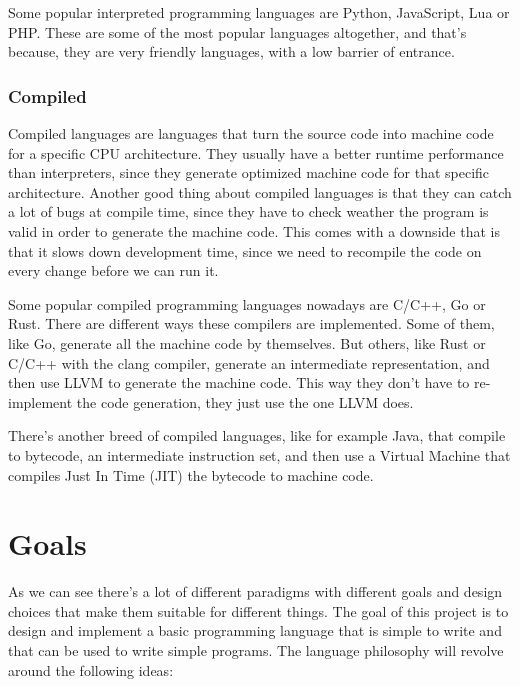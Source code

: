 ﻿\documentclass[10pt,a4paper,twocolumn,twoside]{article}
\begin{document}
Some popular interpreted programming languages are Python, JavaScript, Lua or
PHP. These are some of the most popular languages altogether, and that's
because, they are very friendly languages, with a low barrier of entrance.

\subsubsection{Compiled}
Compiled languages are languages that turn the source code into machine code for
a specific CPU architecture. They usually have a better runtime performance than
interpreters, since they generate optimized machine code for that specific
architecture. Another good thing about compiled languages is that they can catch
a lot of bugs at compile time, since they have to check weather the program is
valid in order to generate the machine code. This comes with a downside that is
that it slows down development time, since we need to recompile the code on
every change before we can run it.

Some popular compiled programming languages nowadays are C/C++, Go or Rust.
There are different ways these compilers are implemented. Some of them, like Go,
generate all the machine code by themselves. But others, like Rust or C/C++ with
the clang compiler, generate an intermediate representation, and then use LLVM
to generate the machine code. This way they don't have to re-implement the code
generation, they just use the one LLVM does.

There's another breed of compiled languages, like for example Java, that
compile to bytecode, an intermediate instruction set, and then use a Virtual 
Machine that compiles Just In Time (JIT) the bytecode to machine code.



\section{Goals}

As we can see there's a lot of different paradigms with different goals and
design choices that make them suitable for different things. The goal of this
project is to design and implement a basic programming language that is simple
to write and that can be used to write simple programs. The language philosophy
will revolve around the following ideas:
\end{document}
